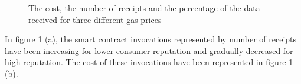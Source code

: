 \documentclass[letterpaper, 10 pt, conference]{ieeeconf}  %
\begin{document}
\begin{figure}%
    \centering
    \qquad
    \qquad
    \caption{The cost, the number of receipts and the percentage of the data received for three different gas prices}%
    \label{2FigEvaluation}%
\end{figure}

 In figure \ref{2FigEvaluation} (a), the smart contract invocations represented by number of receipts have been increasing for lower consumer reputation and gradually decreased for high reputation. The cost of these invocations have been represented in figure \ref{2FigEvaluation} (b).
 
\end{document}

